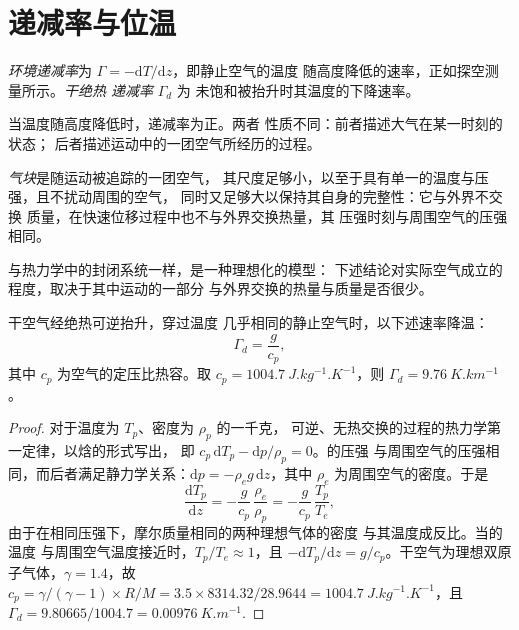 \section{递减率与位温}\label{sec:b1:fluid-envelopes-structure:lapse}

\begin{definition}[环境递减率与干绝热递减率]\label{def:b1:fluid-envelopes-structure:lapse-rate}
\emph{环境递减率}为 $\Gamma =
-\mathrm dT/\mathrm dz$，即静止空气的温度
随高度降低的速率，正如探空测量所示。\emph{干绝热
递减率} $\Gamma_d$ 为
未饱和被抬升时其温度的下降速率。
\end{definition}

当温度随高度降低时，递减率为正。两者
性质不同：前者描述大气在某一时刻的状态；
后者描述运动中的一团空气所经历的过程。

\begin{definition}[气块]\label{def:b1:fluid-envelopes-structure:parcel}
\emph{气块}是随运动被追踪的一团空气，
其尺度足够小，以至于具有单一的温度与压强，且不扰动周围的空气，
同时又足够大以保持其自身的完整性：它与外界不交换
质量，在快速位移过程中也不与外界交换热量，其
压强时刻与周围空气的压强相同。
\end{definition}

与热力学中的封闭系统一样，是一种理想化的模型：
下述结论对实际空气成立的程度，取决于其中运动的一部分
与外界交换的热量与质量是否很少。

\begin{theorem}[干绝热递减率]\label{thm:b1:fluid-envelopes-structure:dry-adiabatic}
干空气经绝热可逆抬升，穿过温度
几乎相同的静止空气时，以下述速率降温：
\[
  \Gamma_d = \frac{g}{c_p},
\]
其中 $c_p$ 为空气的定压比热容。取 $c_p =
\qty{1004.7}{J.kg^{-1}.K^{-1}}$，则 $\Gamma_d = \qty{9.76}{K.km^{-1}}$。
\end{theorem}

\begin{proof}
对于温度为 $T_p$、密度为 $\rho_p$ 的一千克，
可逆、无热交换的过程的热力学第一定律，以焓的形式写出，
即 $c_p\,\mathrm dT_p - \mathrm dp/\rho_p = 0$。的压强
与周围空气的压强相同，而后者满足静力学关系：$\mathrm dp = -\rho_e
g\,\mathrm dz$，其中 $\rho_e$ 为周围空气的密度。于是
\[
  \frac{\mathrm dT_p}{\mathrm dz} = -\frac{g}{c_p}\,\frac{\rho_e}{\rho_p}
  = -\frac{g}{c_p}\,\frac{T_p}{T_e},
\]
由于在相同压强下，摩尔质量相同的两种理想气体的密度
与其温度成反比。当的温度
与周围空气温度接近时，$T_p/T_e \approx 1$，且 $-\mathrm dT_p/\mathrm dz
= g/c_p$。干空气为理想双原子气体，$\gamma = 1.4$，故 $c_p =
\gamma/(\gamma - 1) \times R/M = 3.5 \times 8314.32/28.9644 =
\qty{1004.7}{J.kg^{-1}.K^{-1}}$，且 $\Gamma_d = 9.80665/1004.7 =
\qty{0.00976}{K.m^{-1}}$.
\end{proof}

